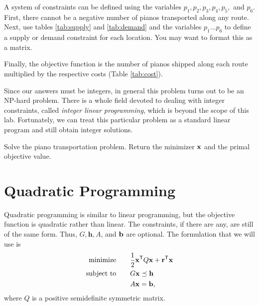 A system of constraints can be defined using the variables $p_1,p_2,p_3,p_4,p_5,$ and $p_6$.
First, there cannot be a negative number of pianos transported along any route.
Next, use tables \ref{tab:supply} and \ref{tab:demand} and the variables $p_1...p_6$ to define a supply or demand constraint for each location.
You may want to format this as a matrix.
\begin{comment} %
the following three supply constraints and two demand constraints:
\begin{align*}
p_1 + p_2  &= 7\\
p_3 + p_4  &= 2\\
p_5 + p_6  &= 4\\
p_1 + p_3 + p_5 &= 5\\
p_2 + p_4 + p_6 &= 8
\end{align*}
\end{comment}
Finally, the objective function is the number of pianos shipped along each route multiplied by the respective costs (Table \ref{tab:cost}).

\begin{info}
Since our answers must be integers, in general this problem turns out to be an NP-hard problem.
There is a whole field devoted to dealing with integer constraints, called \emph{integer linear programming}, which is beyond the scope of this lab.
Fortunately, we can treat this particular problem as a standard linear program and still obtain integer solutions.
\end{info}

\begin{problem}
Solve the piano transportation problem. %
Return the minimizer $\mathbf{x}$ and the primal objective value.
\end{problem}

\section*{Quadratic Programming}

Quadratic programming is similar to linear programming, but the objective function is quadratic rather than linear.
The constraints, if there are any, are still of the same form.
Thus, $G, \mathbf{h}, A$, and $\mathbf{b}$ are optional.
The formulation that we will use is
\begin{align*}
\text{minimize}\qquad &\frac{1}{2}\mathbf{x}^{\mathsf T} Q\mathbf{x} + \mathbf{r}^{\mathsf T} \mathbf{x} \\
\text{subject to}\qquad &G\mathbf{x} \preceq \mathbf{h}\\
 &A\mathbf{x} = \mathbf{b},
\end{align*}
where $Q$ is a positive semidefinite symmetric matrix.

